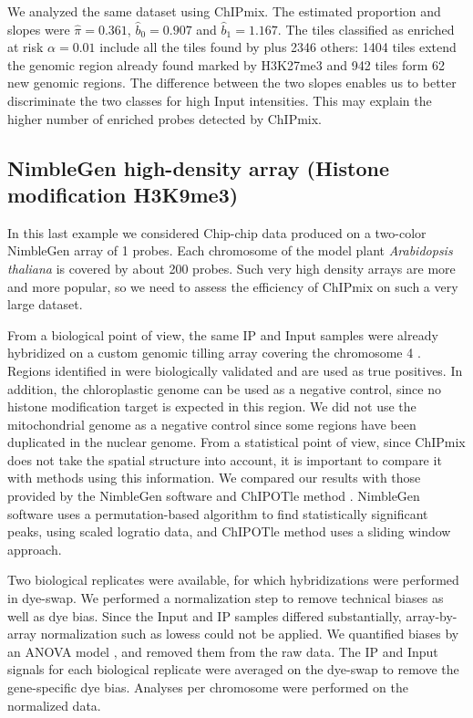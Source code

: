 \documentclass{bioinfo}
\begin{document}
We analyzed the same dataset using ChIPmix. The estimated proportion
and slopes were $\widehat{\pi}=0.361$, $\widehat{b}_0=0.907$ and
$\widehat{b}_1=1.167$. The tiles classified as enriched at risk
$\alpha=0.01$ include all the tiles found by \cite{Turck07} plus
2346 others: 1404 tiles extend the genomic region already found
marked by H3K27me3 and 942 tiles form 62 new genomic regions. The
difference between the two slopes enables us to better discriminate
the two classes for high Input intensities. This may explain the
higher number of enriched probes detected by ChIPmix.


\subsection{NimbleGen high-density array (Histone modification H3K9me3)}\label{HistModifH3K9me3}
In this last example we considered Chip-chip data produced on a
two-color NimbleGen array of 1 probes. Each chromosome of
the model plant \textit{Arabidopsis thaliana} is covered by about
200 probes. Such very high density arrays are more and more
popular, so we need to assess the efficiency of ChIPmix on such a
very large dataset.

From a biological point of view, the same IP and Input samples were
already hybridized on a custom genomic tilling array covering the
chromosome 4 \citep{Turck07}. Regions identified in \cite{Turck07}
were biologically validated and are used as true positives. In
addition, the chloroplastic genome can be used as a negative
control, since no histone modification target is expected in this
region. We did not use the mitochondrial genome as a negative control
since some regions have been duplicated in the nuclear genome.
From a statistical point of view, since ChIPmix does not take  the
spatial structure into account, it is important to compare it with methods
using this information. We compared our
results with those provided by the NimbleGen software and ChIPOTle method \citep{BuckNobelLieb05}. NimbleGen software uses a permutation-based algorithm to
find statistically significant peaks, using scaled logratio data, and
ChIPOTle method uses a sliding window approach. \\
{\par} Two biological replicates were available, for which
hybridizations were performed in dye-swap. We performed a
normalization step to remove technical biases as well as dye bias.
Since the Input and IP samples differed substantially, array-by-array
normalization such as lowess could not be applied.  We quantified biases
by an ANOVA model \citep{Kerr02}, and removed them from the raw data.
The IP and Input signals for each biological replicate were averaged
on the dye-swap to remove the gene-specific dye bias. Analyses per chromosome were performed on the
normalized data.
\end{document}
